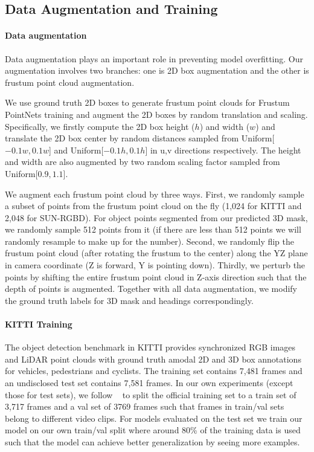 \subsection{Data Augmentation and Training}

\paragraph{Data augmentation} Data augmentation plays an important role in preventing model overfitting. Our augmentation involves two branches: one is 2D box augmentation and the other is frustum point cloud augmentation.

We use ground truth 2D boxes to generate frustum point clouds for Frustum PointNets training and augment the 2D boxes by random translation and scaling. Specifically, we firstly compute the 2D box height ($h$) and width ($w$) and translate the 2D box center by random distances sampled from Uniform[$-0.1w, 0.1w$] and Uniform[$-0.1h, 0.1h$] in u,v directions respectively. The height and width are also augmented by two random scaling factor sampled from Uniform[$0.9, 1.1$].

We augment each frustum point cloud by three ways. First, we randomly sample a subset of points from the frustum point cloud on the fly (1,024 for KITTI and 2,048 for SUN-RGBD). For object points segmented from our predicted 3D mask, we randomly sample 512 points from it (if there are less than 512 points we will randomly resample to make up for the number). Second, we randomly flip the frustum point cloud (after rotating the frustum to the center) along the YZ plane in camera coordinate (Z is forward, Y is pointing down). Thirdly, we perturb the points by shifting the entire frustum point cloud in Z-axis direction such that the depth of points is augmented. Together with all data augmentation, we modify the ground truth labels for 3D mask and headings correspondingly. 

\paragraph{KITTI Training} The object detection benchmark in KITTI provides synchronized RGB images and LiDAR point clouds with ground truth amodal 2D and 3D box annotations for vehicles, pedestrians and cyclists. The training set contains 7,481 frames and an undisclosed test set contains 7,581 frames. In our own experiments (except those for test sets), we follow ~\cite{chen2016monocular,cvpr17chen} to split the official training set to a train set of 3,717 frames and a val set of 3769 frames such that frames in train/val sets belong to different video clips. For models evaluated on the test set we train our model on our own train/val split where around 80\% of the training data is used such that the model can achieve better generalization by seeing more examples.

